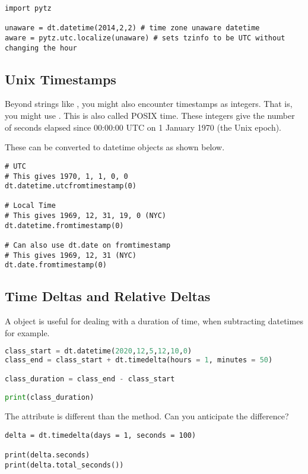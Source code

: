 \begin{lstlisting}
import pytz

unaware = dt.datetime(2014,2,2) # time zone unaware datetime
aware = pytz.utc.localize(unaware) # sets tzinfo to be UTC without changing the hour
\end{lstlisting}

\subsection{Unix Timestamps}

Beyond strings like , you might also encounter timestamps as integers. That is, you might use . This is also called POSIX time. These integers give the number of seconds elapsed since 00:00:00 UTC on 1 January 1970 (the Unix epoch). 

These can be converted to datetime objects as shown below. 

\begin{lstlisting}
# UTC
# This gives 1970, 1, 1, 0, 0
dt.datetime.utcfromtimestamp(0)

# Local Time
# This gives 1969, 12, 31, 19, 0 (NYC)
dt.datetime.fromtimestamp(0)

# Can also use dt.date on fromtimestamp
# This gives 1969, 12, 31 (NYC)
dt.date.fromtimestamp(0)
\end{lstlisting}

\subsection{Time Deltas and Relative Deltas}

A  object is useful for dealing with a duration of time, when subtracting datetimes for example. 


\begin{lstlisting}[language = Python]
class_start = dt.datetime(2020,12,5,12,10,0)
class_end = class_start + dt.timedelta(hours = 1, minutes = 50)

class_duration = class_end - class_start

print(class_duration)
\end{lstlisting}

The  attribute is different than the  method. Can you anticipate the difference?
\begin{lstlisting}
delta = dt.timedelta(days = 1, seconds = 100)

print(delta.seconds)
print(delta.total_seconds())
\end{lstlisting}

